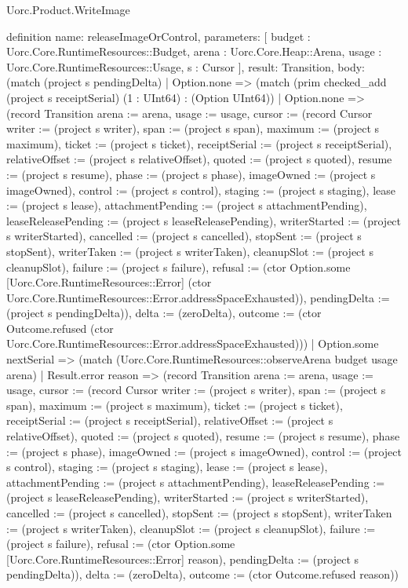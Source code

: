 \begin{lexlean}{Uorc.Product.WriteImage}
\begin{semanticmodule}
definition{
  name: releaseImageOrControl,
  parameters: [
    budget : Uorc.Core.RuntimeResources::Budget,
    arena : Uorc.Core.Heap::Arena,
    usage : Uorc.Core.RuntimeResources::Usage,
    s : Cursor
  ],
  result: Transition,
  body: (match (project s pendingDelta)
    | Option.none => (match (prim checked_add (project s receiptSerial) (1 : UInt64) : (Option UInt64))
      | Option.none => (record Transition {arena := arena, usage := usage, cursor := (record Cursor {writer := (project s writer), span := (project s span), maximum := (project s maximum), ticket := (project s ticket), receiptSerial := (project s receiptSerial), relativeOffset := (project s relativeOffset), quoted := (project s quoted), resume := (project s resume), phase := (project s phase), imageOwned := (project s imageOwned), control := (project s control), staging := (project s staging), lease := (project s lease), attachmentPending := (project s attachmentPending), leaseReleasePending := (project s leaseReleasePending), writerStarted := (project s writerStarted), cancelled := (project s cancelled), stopSent := (project s stopSent), writerTaken := (project s writerTaken), cleanupSlot := (project s cleanupSlot), failure := (project s failure), refusal := (ctor Option.some [Uorc.Core.RuntimeResources::Error] (ctor Uorc.Core.RuntimeResources::Error.addressSpaceExhausted)), pendingDelta := (project s pendingDelta)}), delta := (zeroDelta), outcome := (ctor Outcome.refused (ctor Uorc.Core.RuntimeResources::Error.addressSpaceExhausted))})
      | Option.some nextSerial => (match (Uorc.Core.RuntimeResources::observeArena budget usage arena)
        | Result.error reason => (record Transition {arena := arena, usage := usage, cursor := (record Cursor {writer := (project s writer), span := (project s span), maximum := (project s maximum), ticket := (project s ticket), receiptSerial := (project s receiptSerial), relativeOffset := (project s relativeOffset), quoted := (project s quoted), resume := (project s resume), phase := (project s phase), imageOwned := (project s imageOwned), control := (project s control), staging := (project s staging), lease := (project s lease), attachmentPending := (project s attachmentPending), leaseReleasePending := (project s leaseReleasePending), writerStarted := (project s writerStarted), cancelled := (project s cancelled), stopSent := (project s stopSent), writerTaken := (project s writerTaken), cleanupSlot := (project s cleanupSlot), failure := (project s failure), refusal := (ctor Option.some [Uorc.Core.RuntimeResources::Error] reason), pendingDelta := (project s pendingDelta)}), delta := (zeroDelta), outcome := (ctor Outcome.refused reason)})
}
\end{semanticmodule}
\end{lexlean}
